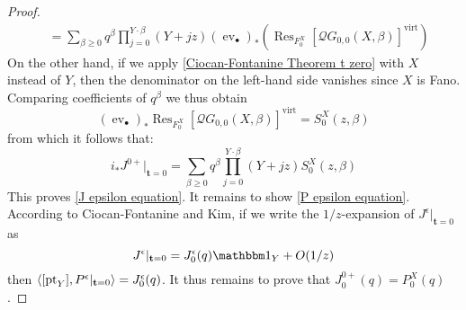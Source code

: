 \documentclass[11pt]{amsart}
\newcommand{\QG}[4]{\mathcal{Q}G_{#1,#2}(#3,#4)}
\newcommand{\virt}[1]{[#1]^{\operatorname{virt}}}
\newcommand{\pt}{\operatorname{pt}}
\newcommand{\ev}{\operatorname{ev}}
\theoremstyle{definition}
\theoremstyle{definition}
\begin{document}
\begin{proof}
\begin{align*}
& = \sum_{\beta \geq 0} q^\beta \prod_{j=0}^{Y \cdot \beta} (Y + jz) (\ev_{\bullet})_* \left( \operatorname{Res}_{F_0^X}\virt{\QG{0}{0}{X}{\beta}} \right) \end{align*}
On the other hand, if we apply \eqref{Ciocan-Fontanine Theorem t zero} with $X$ instead of $Y$, then the denominator on the left-hand side vanishes since $X$ is Fano. Comparing coefficients of $q^\beta$ we thus obtain
\begin{equation*} (\ev_{\bullet})_* \operatorname{Res}_{F_0^X}\virt{\QG{0}{0}{X}{\beta}} = S_0^X(z,\beta) \end{equation*}
from which it follows that:
\begin{equation*} i_*J^{0+}|_{\mathbf{t}=0} = \sum_{\beta \geq 0} q^\beta \prod_{j=0}^{Y\cdot\beta}(Y+jz) S_0^X(z,\beta)\end{equation*}
This proves \eqref{J epsilon equation}. It remains to show \eqref{P epsilon equation}. According to Ciocan-Fontanine and Kim, if we write the $1/z$-expansion of ${J^{\epsilon}}|_{\mathbf{t}=0}$ as
\begin{equation*} {J^{\epsilon}}|_{\mathbf{t}=0}=J^{\epsilon}_{0}(q)\mathbbm 1_Y+O(1/z) \end{equation*}
then $\langle [\pt_Y],  P^\epsilon|_{{\bf t}=0}\rangle=J^{\epsilon}_{0}(q)$. It thus remains to prove that $J^{0+}_0(q)=P_0^X(q)$.


\end{proof}
\end{document}
